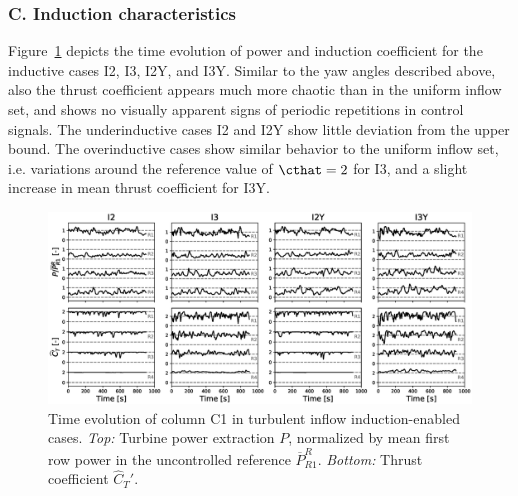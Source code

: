 	\subsubsection{C. Induction characteristics}
	Figure~\ref{fig:dynamic_ctfilt_turb} depicts the time evolution of power and induction coefficient for the inductive cases I2, I3, I2Y, and I3Y. Similar to the yaw angles described above, also the thrust coefficient appears much more chaotic than in the uniform inflow set, and shows no visually apparent signs of periodic repetitions in control signals. The underinductive cases I2 and I2Y show little deviation from the upper bound. The overinductive cases show similar behavior to the uniform inflow set, i.e. variations around the reference value of $\cthat = 2$ for I3, and a slight increase in mean thrust coefficient for I3Y. 
	\begin{figure}
		\includegraphics[width=\textwidth]{chapters/optimal_yaw_control/power_ctfilt_turb_bw.eps}	
		\caption[Time evolution of column C1 in turbulent inflow induction-enabled cases.]{Time evolution of column C1 in turbulent inflow induction-enabled cases. \emph{Top: } Turbine power extraction $P$, normalized by mean first row power in the uncontrolled reference $\overline{P}_{R1}^R$. \emph{Bottom: } Thrust coefficient $\widehat{C}_T'$. \label{fig:dynamic_ctfilt_turb}}
	\end{figure}
	



